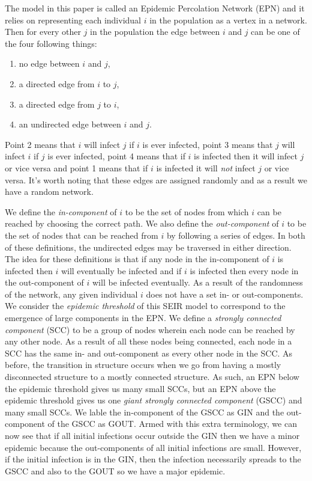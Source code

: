 The model in this paper is called an Epidemic Percolation Network (EPN) and it relies on representing each individual $i$ in the population as a vertex in a
network. Then for every other $j$ in the population the edge between $i$ and $j$ can be one of the four following things:

\begin{enumerate}
  \item no edge between $i$ and $j$,
  \item a directed edge from $i$ to $j$,
  \item a directed edge from $j$ to $i$,
  \item an undirected edge between $i$ and $j$.
\end{enumerate}

Point 2 means that $i$ will infect $j$ if $i$ is ever infected, point 3 means that $j$ will infect $i$ if $j$ is ever infected, point 4 means that if $i$ is infected then it will infect $j$ or vice
versa and point 1 means that if $i$ is infected it will \textit{not} infect $j$ or vice versa. It's worth noting that these edges are assigned randomly and as a result we have a
random network.

We define the \textit{in-component} of $i$ to be the set of nodes from which $i$ can be reached by choosing the correct path. We also define the \textit{out-component} of $i$ to be the set of nodes that can be reached from $i$
by following a series of edges. In both of these definitions, the undirected edges may be traversed in either direction. The idea for these definitions is that if any node in the
in-component of $i$ is infected then $i$ will eventually be infected and if $i$ is infected then every node in the out-component of $i$ will be infected eventually. As a result of
the randomness of the network, any given individual $i$ does not have a set in- or out-components. We consider the \textit{epidemic threshold} of this SEIR model to correspond to
the emergence of large components in the EPN. We define a \textit{strongly connected component} (SCC) to be a group of nodes wherein each node can be reached by any other node. As a
result of all these nodes being connected, each node in a SCC has the same in- and out-component as every other node in the SCC. As before, the transition in structure occurs when
we go from having a mostly disconnected structure to a mostly connected structure. As such, an EPN below the epidemic threshold gives us many small SCCs, but an EPN
above the epidemic threshold gives us one \textit{giant strongly connected component} (GSCC) and many small SCCs. We lable the in-component of the GSCC as GIN and the
out-component of the GSCC as GOUT. Armed with this extra terminology, we can now see that if all initial infections occur outside the GIN then we have a minor epidemic because the
out-components of all initial infections are small. However, if the initial infection is in the GIN, then the infection necessarily spreads to the GSCC and also to the GOUT so we
have a major epidemic.


